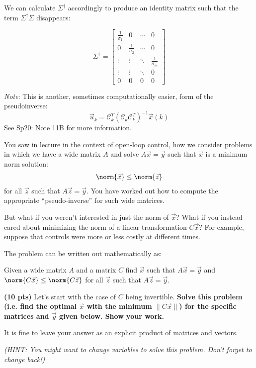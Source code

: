 We can calculate $\Sigma^{\dagger}$ accordingly to produce an identity matrix such that the term $\Sigma^{\dagger}\Sigma$ disappears:

$$\Sigma^{\dagger} = \begin{bmatrix} \frac{1}{\sigma_{1}} & 0 &  \cdots & 0 \\ 0 & \frac{1}{\sigma_{2}} & \cdots & 0 \\ \vdots & \vdots & \ddots & \frac{1}{\sigma_{m}} \\ 
    \vdots & \vdots & \ddots & 0 \\ 0 & 0 & 0 & 0 \end{bmatrix}$$

\textit{Note}: This is another, sometimes computationally easier, form of the pseudoinverse:
$$\vec{u}_k = \mathcal{C}_k^T(\mathcal{C}_k\mathcal{C}_k^T)^{-1}\vec{x}(k)$$
See Sp20: Note 11B for more information.

\newpage

You saw in lecture in the context of open-loop control, how we
consider problems in which we have a wide
matrix $A$ and solve $A \vec{x} = \vec{y}$ such that $\vec{x}$
is a minimum norm solution:  
\begin{align*}
\norm{\vec{x}} \leq \norm{\vec{z}} 
\end{align*}
for all $\vec{z}$ such that $A \vec{z} = \vec{y}$. You have worked out how to compute the appropriate ``pseudo-inverse'' for
such wide matrices.

But what if you weren't interested in just the norm of $\vec{x}$? What
if you instead cared about minimizing the norm of a linear transformation $C\vec{x}$? For example, suppose that controls were more or less costly
at different times. 

The problem can be written out mathematically as:

Given a wide matrix  $A$ and a matrix $C$ find $\vec{x}$ such that $A \vec{x} = \vec{y}$ and 
$\norm{C\vec{x}} \leq \norm{C\vec{z}} $ for all 
$\vec{z}$ such that $A \vec{z} = \vec{y}$.


{\bf(10 pts)} Let's start with the case of $C$ being invertible. {\bfseries Solve
  this problem (i.e. find the optimal $\vec{x}$ with the minimum $\|C \vec{x}\|$) for the specific
  matrices and $\vec{y}$ given below. Show your work.}

It is fine to leave your answer as an explicit product of
matrices and vectors.

{\em (HINT: You might want to change variables to solve this
  problem. Don't forget to change back!)} 

